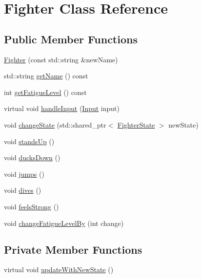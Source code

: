 \hypertarget{classFighter}{}\section{Fighter Class Reference}
\label{classFighter}
\subsection*{Public Member Functions}
\begin{DoxyCompactItemize}
\item 
\hyperlink{classFighter_a2c8f42ee30394dc361c659c26666b0a5}{Fighter} (const std\+::string \&new\+Name)
\item 
std\+::string \hyperlink{classFighter_aea4a9cf98a672b2305d1147885b91c34}{get\+Name} () const 
\item 
int \hyperlink{classFighter_a1bc4025d988b66dfceaf0005e74f34ff}{get\+Fatigue\+Level} () const 
\item 
virtual void \hyperlink{classFighter_a178751f22e18d2e5cb02a05a766f6b24}{handle\+Input} (\hyperlink{State_8cpp_a080a822f0093973313bd644e517a5090}{Input} input)
\item 
void \hyperlink{classFighter_add08055f60abd6e9235291b653f65be5}{change\+State} (std\+::shared\+\_\+ptr$<$ \hyperlink{classFighterState}{Fighter\+State} $>$ new\+State)
\item 
void \hyperlink{classFighter_a6f54ee51d7ca6b3baa60dd19bb4546c5}{stands\+Up} ()
\item 
void \hyperlink{classFighter_afff11a1b3dacee662cb3fbe35f54df17}{ducks\+Down} ()
\item 
void \hyperlink{classFighter_a32a4250077afba9b3629a8f553dd8776}{jumps} ()
\item 
void \hyperlink{classFighter_a56cef6bffcdf9775f9d924cd213ed704}{dives} ()
\item 
void \hyperlink{classFighter_ae54fd861131ec55b366a9163a35d9606}{feels\+Strong} ()
\item 
void \hyperlink{classFighter_aa9c08ec29097e326eab0ffd69db18b9c}{change\+Fatigue\+Level\+By} (int change)
\end{DoxyCompactItemize}
\subsection*{Private Member Functions}
\begin{DoxyCompactItemize}
\item 
virtual void \hyperlink{classFighter_a0bd51ab4d6d20942b9f2fca23e1e7e4b}{update\+With\+New\+State} ()
\end{DoxyCompactItemize}
